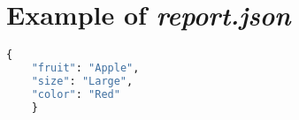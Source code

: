 \chapter{Example of \emph{report.json}}

\begin{lstlisting}[language=Python]
    {
    "fruit": "Apple",
    "size": "Large",
    "color": "Red"
    }
\end{lstlisting}